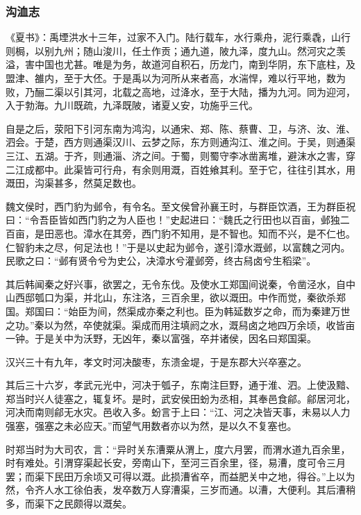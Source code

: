 \documentclass[]{article}
\begin{document}
\hypertarget{header-n2715}{%
\subsubsection{沟洫志}\label{header-n2715}}

《夏书》：禹堙洪水十三年，过家不入门。陆行载车，水行乘舟，泥行乘毳，山行则梮，以别九州；随山浚川，任土作贡；通九道，陂九泽，度九山。然河灾之羡溢，害中国也尤甚。唯是为务，故道河自积石，历龙门，南到华阴，东下底柱，及盟津、雒内，至于大伾。于是禹以为河所从来者高，水湍悍，难以行平地，数为败，乃酾二渠以引其河，北载之高地，过洚水，至于大陆，播为九河。同为迎河，入于勃海。九川既疏，九泽既陂，诸夏乂安，功施乎三代。

自是之后，荥阳下引河东南为鸿沟，以通宋、郑、陈、蔡曹、卫，与济、汝、淮、泗会。于楚，西方则通渠汉川、云梦之际，东方则通沟江、淮之间。于吴，则通渠三江、五湖。于齐，则通淄、济之间。于蜀，则蜀守李冰凿离堆，避沫水之害，穿二江成都中。此渠皆可行舟，有余则用溉，百姓飨其利。至于它，往往引其水，用溉田，沟渠甚多，然莫足数也。

魏文侯时，西门豹为邺令，有令名。至文侯曾孙襄王时，与群臣饮酒，王为群臣祝曰：``令吾臣皆如西门豹之为人臣也！''史起进曰：``魏氏之行田也以百亩，邺独二百亩，是田恶也。漳水在其旁，西门豹不知用，是不智也。知而不兴，是不仁也。仁智豹未之尽，何足法也！''于是以史起为邺令，遂引漳水溉邺，以富魏之河内。民歌之曰：``邺有贤令兮为史公，决漳水兮灌邺旁，终古舄卤兮生稻梁''。

其后韩闻秦之好兴事，欲罢之，无令东伐。及使水工郑国间说秦，令凿泾水，自中山西邸瓠口为渠，并北山，东注洛，三百余里，欲以溉田。中作而觉，秦欲杀郑国。郑国曰：``始臣为间，然渠成亦秦之利也。臣为韩延数岁之命，而为秦建万世之功。''秦以为然，卒使就渠。渠成而用注填阏之水，溉舄卤之地四万余顷，收皆亩一钟。于是关中为沃野，无凶年，秦以富强，卒并诸侯，因名曰郑国渠。

汉兴三十有九年，孝文时河决酸枣，东溃金堤，于是东郡大兴卒塞之。

其后三十六岁，孝武元光中，河决于瓠子，东南注巨野，通于淮、泗。上使汲黯、郑当时兴人徒塞之，辄复坏。是时，武安侯田蚡为丞相，其奉邑食鄃。鄃居河北，河决而南则鄃无水灾。邑收入多。蚡言于上曰：``江、河之决皆天事，未易以人力强塞，强塞之未必应天。''而望气用数者亦以为然，是以久不复塞也。

时郑当时为大司农，言：``异时关东漕粟从渭上，度六月罢，而渭水道九百余里，时有难处。引渭穿渠起长安，旁南山下，至河三百余里，径，易漕，度可令三月罢；而渠下民田万余顷又可得以溉。此损漕省卒，而益肥关中之地，得谷。''上以为然，令齐人水工徐伯表，发卒数万人穿漕渠，三岁而通。以漕，大便利。其后漕稍多，而渠下之民颇得以溉矣。
\end{document}
